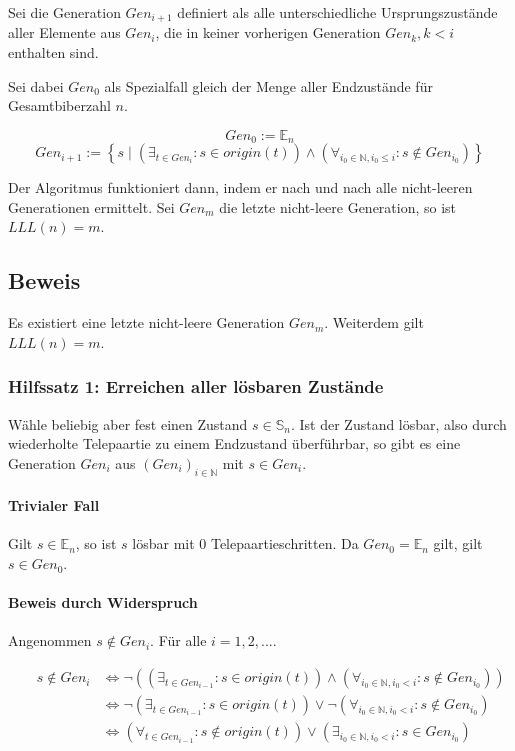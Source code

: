 \documentclass[a4paper,10pt,ngerman]{scrartcl}
\begin{document}
Sei die Generation \(Gen_{i+1}\) definiert als alle unterschiedliche Ursprungszustände aller Elemente aus \(Gen_i\), die in keiner vorherigen Generation \(Gen_k, k < i\) enthalten sind.

Sei dabei \(Gen_0\) als Spezialfall gleich der Menge aller Endzustände für Gesamtbiberzahl \(n\).

\[Gen_0 := \mathbb{E}_n\]
\[Gen_{i+1} := \left\{ s \mid \left(\exists_{t \in Gen_i} : s \in origin(t)\right) \land \left(\forall_{i_0\in\mathbb{N}, i_0 \leq i}: s \notin Gen_{i_0}\right) \right\}\]

Der Algoritmus funktioniert dann, indem er nach und nach alle nicht-leeren Generationen ermittelt. Sei \(Gen_m\) die letzte nicht-leere Generation, so ist \(LLL(n) = m\).

\subsection{Beweis}

Es existiert eine letzte nicht-leere Generation \(Gen_m\).
Weiterdem gilt \(LLL(n) = m\).

\subsubsection{Hilfssatz 1: Erreichen aller lösbaren Zustände} \label{proof:completeness}

Wähle beliebig aber fest einen Zustand \(s\in\mathbb{S}_n\).
Ist der Zustand lösbar, also durch wiederholte Telepaartie zu einem Endzustand überführbar, so gibt es eine Generation \(Gen_i\) aus \((Gen_i)_{i\in\mathbb{N}}\) mit \(s\in Gen_i\).

\paragraph{Trivialer Fall}
Gilt \(s\in\mathbb{E}_n\), so ist \(s\) lösbar mit 0 Telepaartieschritten. Da \(Gen_0 = \mathbb{E}_n\) gilt, gilt \(s \in Gen_0\).

\paragraph{Beweis durch Widerspruch}

Angenommen \(s \notin Gen_{i}\). Für alle \(i=1,2,...\).

\begin{align*}
    &&s \notin Gen_{i} &\iff \lnot\left(\left(\exists_{t \in Gen_{i-1}} : s \in origin(t)\right) \land \left(\forall_{i_0\in\mathbb{N}, i_0 < i}: s \notin Gen_{i_0}\right)\right) \\
    && &\iff \lnot\left(\exists_{t \in Gen_{i-1}} : s \in origin(t)\right) \lor \lnot\left(\forall_{i_0\in\mathbb{N}, i_0 < i}: s \notin Gen_{i_0}\right) \\
    && &\iff \left(\forall_{t \in Gen_{i-1}} : s \notin origin(t)\right) \lor \left(\exists_{i_0\in\mathbb{N}, i_0 < i}: s \in Gen_{i_0}\right)
\end{align*}
\end{document}
